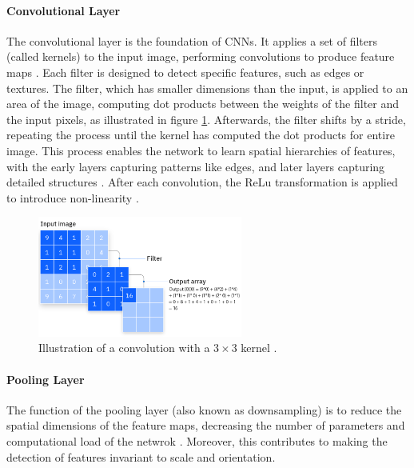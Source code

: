 \paragraph{Convolutional Layer}
The convolutional layer is the foundation of CNNs. It applies a set of filters (called kernels) to the input image, performing convolutions to produce feature maps \cite{cs231n}. Each filter is designed to detect specific features, such as edges or textures. The filter, which has smaller dimensions than the input, is applied to an area of the image, computing dot products between the weights of the filter and the input pixels, as illustrated in figure \ref{fig:convolution}. Afterwards, the filter shifts by a stride, repeating the process until the kernel has computed the dot products for entire image. This process enables the network to learn spatial hierarchies of features, with the early layers capturing patterns like edges, and later layers capturing detailed structures \cite{yosinski2014transferablefeaturesdeepneural}. After each convolution, the ReLu transformation is applied to introduce non-linearity \cite{cs231n}.

\begin{figure}[ht]
    \centering
    \includegraphics[width=0.6\textwidth]{Images/convolution.png} 
    \caption{Illustration of a convolution with a $3\times 3$ kernel \cite{ibm_cnn}.}
    \label{fig:convolution}
\end{figure}

\paragraph{Pooling Layer}
The function of the pooling layer (also known as downsampling) is to reduce the spatial dimensions of the feature maps, decreasing the number of parameters and computational load of the netwrok \cite{cs231n}. Moreover, this contributes to making the detection of features invariant to scale and orientation.  

